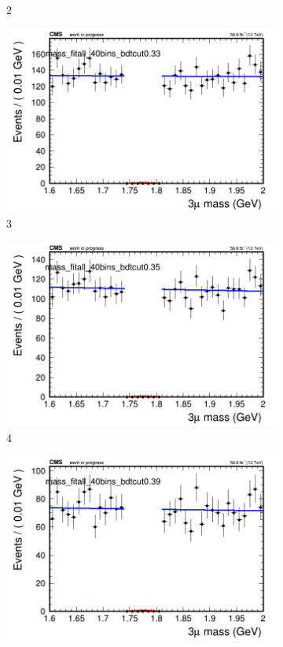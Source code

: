 \begin{figure}[h!]
\begin{subfigure}{0.2\textwidth}
        \caption{2}
    \end{subfigure}
    \begin{subfigure}{0.2\textwidth}
        \includegraphics[width=\textwidth]{unfixed_exp/plots/all/massfit_all_40bins_bdtcut0.33.png}
        \caption{3}
    \end{subfigure}
    \begin{subfigure}{0.2\textwidth}
        \includegraphics[width=\textwidth]{unfixed_exp/plots/all/massfit_all_40bins_bdtcut0.35.png}
        \caption{4}
    \end{subfigure}
    \begin{subfigure}{0.2\textwidth}
        \includegraphics[width=\textwidth]{unfixed_exp/plots/all/massfit_all_40bins_bdtcut0.39.png}

\end{subfigure}
\end{figure}
